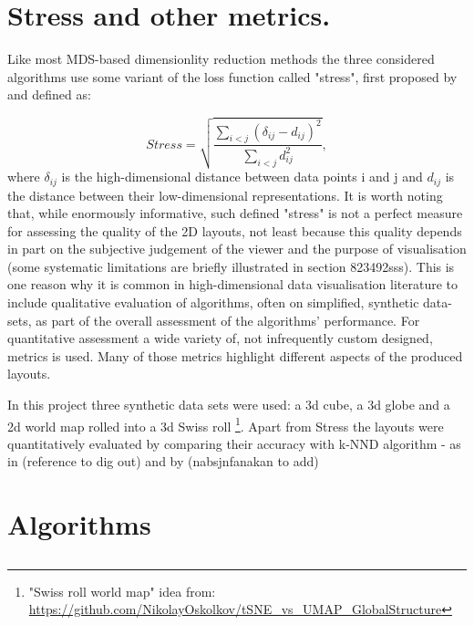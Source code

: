 \documentclass{l4proj}
\begin{document}
\section{Stress and other metrics.}

Like most MDS-based dimensionlity reduction methods the three considered algorithms use some variant of the loss function called "stress", first proposed by \citet{og_stress} and defined as: 

\begin{equation}
\label{tab:stress}
    Stress = \sqrt{\frac{\sum_{i<j}(\delta_{ij} - d_{ij})^2 }{\sum_{i<j}d_{ij}^2}},
\end{equation}    
where $\delta_{ij}$ is the high-dimensional distance between data points i and j and $d_{ij}$ is the distance between their low-dimensional representations. It is worth noting that, while enormously informative, such defined "stress" is not a perfect measure for assessing the quality of the 2D layouts, not least because this quality depends in part on the subjective judgement of the viewer and the purpose of visualisation (some systematic limitations are briefly illustrated in section 823492sss). This is one reason why it is common in  high-dimensional data visualisation literature to include qualitative evaluation of algorithms, often on simplified, synthetic data-sets, as part of the overall assessment of the algorithms' performance. For quantitative assessment a wide variety of, not infrequently custom designed, metrics is used. Many of those metrics highlight different aspects of the produced layouts. 

In this project three synthetic data sets were used: a 3d cube, a 3d globe and a 2d world map rolled into a 3d Swiss roll \footnote{"Swiss roll world map" idea from: \url{https://github.com/NikolayOskolkov/tSNE_vs_UMAP_GlobalStructure}}. Apart from Stress the layouts were quantitatively evaluated by comparing their accuracy with k-NND algorithm - as in (reference to dig out) and by (nabsjnfanakan to add)

\section{Algorithms}


\subsection{\cite{Chalmers96}}
\end{document}
